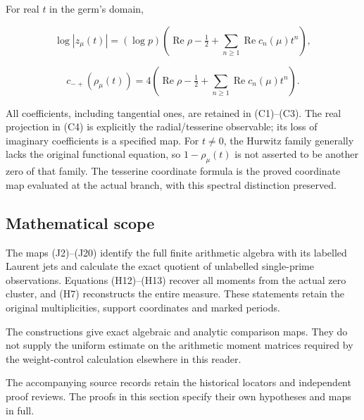 For real \(t\) in the germ's domain,

\[
\log|z_\mu(t)|
=(\log p)\left(\operatorname{Re}\rho-\tfrac12+
\sum_{n\ge1}\operatorname{Re}c_n(\mu)t^n\right),
\]

\[
c_{-+}(\rho_\mu(t))=4\left(\operatorname{Re}\rho-\tfrac12+
\sum_{n\ge1}\operatorname{Re}c_n(\mu)t^n\right).
\tag{C4}
\]

All coefficients, including tangential ones, are retained in (C1)--(C3). The real projection in (C4) is explicitly the radial/tesserine observable; its loss of imaginary coefficients is a specified map. For \(t\ne 0\), the Hurwitz family generally lacks the original functional equation, so \(1-\rho _\mu (t)\) is not asserted to be another zero of that family. The tesserine coordinate formula is the proved coordinate map evaluated at the actual branch, with this spectral distinction preserved.

\subsection{Mathematical scope}\label{handoff-and-scope}

The maps (J2)--(J20) identify the full finite arithmetic algebra with
its labelled Laurent jets and calculate the exact quotient of
unlabelled single-prime observations. Equations (H12)--(H13) recover
all moments from the actual zero cluster, and (H7) reconstructs the
entire measure. These statements retain the original multiplicities,
support coordinates and marked periods.

The constructions give exact algebraic and analytic comparison maps.
They do not supply the uniform estimate on the arithmetic moment
matrices required by the weight-control calculation elsewhere in
this reader.

The accompanying source records retain the historical locators and
independent proof reviews. The proofs in this section specify their
own hypotheses and maps in full.
